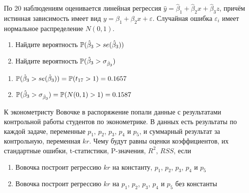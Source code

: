 \documentclass[pdftex,11pt,openany]{book}\usepackage[]{graphicx}\usepackage[]{color}
\begin{document}
\begin{problem}
 По 20 наблюдениям оценивается линейная регрессия $\hat{y}=\hat{\beta}_1 +\hat{\beta}_2 x+\hat{\beta}_3 z$, причём истинная зависимость имеет вид $y=\beta_1 +\beta_2 x+\varepsilon$. Случайная ошибка $\varepsilon_i$ имеет нормальное распределение $N(0,1)$.

\begin{enumerate}
\item Найдите вероятность $\P(\hat{\beta}_3>se(\hat{\beta}_3))$
\item Найдите вероятность $\P(\hat{\beta}_3>\sigma_{\hat{\beta}_3})$
\end{enumerate}
\end{problem}
 
\begin{solution}

\begin{enumerate}
\item $\P(\hat{\beta}_3>se(\hat{\beta}_3))=\P(t_{17}>1)=0.1657$
\item $\P(\hat{\beta}_3>\sigma_{\hat{\beta}_3})=\P(N(0,1)>1)=0.1587$
\end{enumerate}
\end{solution}


\begin{problem}
 К эконометристу Вовочке в распоряжение попали данные с результатами контрольной работы студентов по эконометрике. В данных есть результаты по каждой задаче, переменные $p_1$, $p_2$, $p_3$, $p_4$ и $p_5$, и суммарный результат за контрольную, переменная $kr$. Чему будут равны оценки коэффициентов, их стандартные ошибки, t-статистики, P-значения, $R^2$, $RSS$, если
\begin{enumerate}
\item Вовочка построит регрессию $kr$ на константу, $p_1$, $p_2$, $p_3$, $p_4$ и $p_5$
\item Вовочка построит регрессию $kr$ на $p_1$, $p_2$, $p_3$, $p_4$ и $p_5$ без константы
\end{enumerate}
\end{problem}
 
\begin{solution}
\end{solution}
\end{document}
